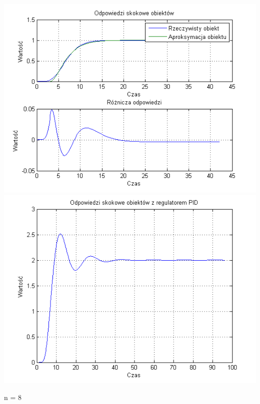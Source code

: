\documentclass[10pt,a4paper]{article}
\begin{document}
\begin{center}
\includegraphics[scale=1]{images/dwa/skrypt_113.png}\\
\includegraphics[scale=1]{images/dwa/skrypt_114.png}\\
\end{center}
\newpage
n = 8
\end{document}
